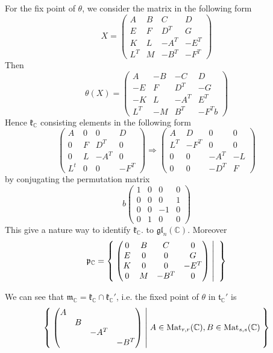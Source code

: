 \documentclass[12pt]{amsart}
\def\Mat{{\rm Mat}}
\def\bC{{\mathbb{C}}}
\def\agl{\mathfrak{gl}}
\def\fpp{\mathfrak{p}}
\def\ftt{\mathfrak{t}}
\def\fkk{\mathfrak{k}}
\def\fmm{\mathfrak{m}}
\def\Mat{\mathrm{Mat}}
\begin{document}
For the fix point of $\theta$, we consider the matrix in the following form
\[
X = \begin{pmatrix}
  A & B & C & D\\
  E & F & {D}^{T} & G\\
  K & L & -{A}^{T} & -{E}^{T}\\
  {L}^{T} & M & -{B}^{T} & -{F}^{T}
\end{pmatrix}
\]
Then 
\[
\theta(X) = 
\begin{pmatrix}
  A & -B & -C & D\\
  -E & F & {D}^{T} & -G\\
  -K & L & -{A}^{T} & {E}^{T}\\
  {L}^{T} & -M & {B}^{T} & -{F}^{T}
b\end{pmatrix}
\]
Hence $\fkk_\bC$ consisting elements in the following form
\[
\begin{pmatrix}
  A & 0 & 0 & D\\
  0 & F & {D}^{T} & 0\\
  0 & L & -{A}^{T} & 0\\
 {L}^{t} & 0 & 0 & -{F}^{T}
\end{pmatrix}
\Rightarrow
\begin{pmatrix}
  A & D & 0 & 0\\
  {L}^{T} & -{F}^{T} & 0 & 0\\
  0 & 0 & -{A}^{T} & -L\\
  0 & 0 & -{D}^{T} & F
\end{pmatrix}
\]
by conjugating the permutation matrix
\[
b\begin{pmatrix}
  1 & 0 & 0 & 0\\
  0 & 0 & 0 & 1\\
  0 & 0 & -1 & 0\\
  0 & 1 & 0 & 0
\end{pmatrix}
\]
This give a nature way to identify $\fkk_\bC$. to $\agl_n(\bC)$.
Moreover 
\[
\fpp_\bC = \Set{
\begin{pmatrix}
  0 & B & C & 0\\
 E & 0 & 0 & G\\
 K & 0 & 0 & -{E}^{T}\\
 0 & M & -{B}^{T} & 0
\end{pmatrix}
|
}
\]


We can see that $\fmm_\bC = \fkk_\bC \cap \fkk_\bC'$, i.e. 
the fixed point of $\theta$ in $\ftt_\bC'$ is 
\[
\Set{\begin{pmatrix}
    A & & & \\
    & B & & \\
    & & -A^T &\\
    & & & -B^T 
  \end{pmatrix}|
  A\in \Mat_{r,r}(\bC), B\in \Mat_{s,s}(\bC)
}
\]
\end{document}
